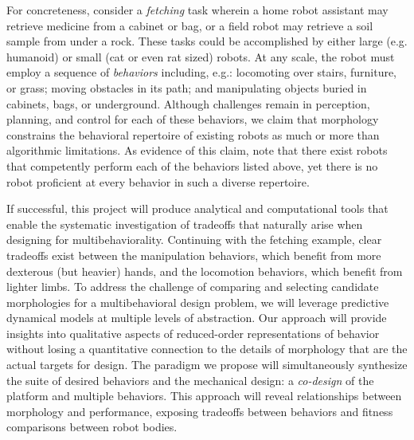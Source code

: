 \documentclass[11pt]{article}
\begin{document}
For concreteness, consider a \emph{fetching} task wherein
a home robot assistant may retrieve medicine from a cabinet or bag, or
a field robot may retrieve a soil sample from under a rock.
These tasks could be accomplished by either large (e.g. humanoid) or small (cat or even rat sized) robots.
At any scale, the robot must employ a sequence of \emph{behaviors} including, e.g.:
locomoting over stairs, furniture, or grass; moving obstacles in its path;
and
manipulating objects buried in cabinets, bags, or underground.
Although challenges remain in perception, planning, and control for each of these behaviors,
we claim that morphology constrains the behavioral repertoire of existing robots as much or more than algorithmic limitations.
As evidence of this claim, note that there exist robots that competently perform each of the behaviors listed above, yet there is no robot proficient at every behavior in such a diverse repertoire.


If successful, this project will produce analytical and computational tools that enable the systematic investigation of tradeoffs that naturally arise when designing for multibehaviorality.
Continuing with the fetching example, clear tradeoffs exist between the manipulation 
behaviors, which benefit from more dexterous (but heavier) hands, and the locomotion behaviors, which benefit from lighter limbs. 
To address the challenge of comparing and selecting candidate morphologies for a multibehavioral design problem, we will leverage predictive dynamical models at multiple levels of abstraction.
Our approach will provide insights into qualitative aspects of reduced-order representations of behavior without losing a quantitative connection to the details of morphology that are the actual targets for design. 
The paradigm 
we propose will simultaneously synthesize the suite of desired behaviors and the mechanical design: a \emph{co-design} of the platform and multiple behaviors.
This approach will reveal relationships between morphology and performance, exposing tradeoffs between behaviors and fitness comparisons between robot bodies.

\end{document}
